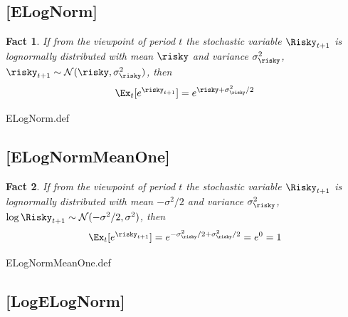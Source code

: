 \documentclass{handout}
\newtheorem{Fact}{Fact}
\begin{document}
\hypertarget{ELogNorm}{}
\subsection{{[{ELogNorm}]}}

\begin{Fact} If from the viewpoint of period $t$ the stochastic variable $\Risky_{t+1}$ is lognormally distributed with mean $\null{\risky}$ and variance $\sigma_{\risky}^{2}$, $\risky_{t+1} \sim \mathcal{N}(\null{\risky},\sigma_{\risky}^{2})$, then 
\begin{equation}
        \Ex_{t}[e^{\risky_{t+1}}] = e^{\null{\risky}+\sigma_{\risky}^{2}/2} \label{eq:ELogNorm}
\end{equation}
\end{Fact}

\begin{verbatimwrite}{ELogNorm.def}
\providecommand{\ELogNorm}{\href{http://www.econ2.jhu.edu/people/ccarroll/public/LectureNotes/MathFacts/MathFactsList\#ELogNorm}{\ensuremath{\mathtt{[ELogNorm]}}}}
\end{verbatimwrite}

\hypertarget{ELogNormMeanOne}{}
\subsection{[ELogNormMeanOne]}

\begin{Fact} If from the viewpoint of period $t$ the stochastic variable $\Risky_{t+1}$ is lognormally distributed with mean $-\sigma^{2}/2$ and variance $\sigma_{\risky}^{2}$, $\log \Risky_{t+1} \sim \mathcal{N}(-\sigma^{2}/2,\sigma^{2})$, then 
\begin{equation}
        \Ex_{t}[e^{\risky_{t+1}}] = e^{-\sigma_{\risky}^{2}/2+\sigma_{\risky}^{2}/2}=e^{0}=1 \label{eq:ELogNormMeanOne}
\end{equation}
\end{Fact}

\begin{verbatimwrite}{ELogNormMeanOne.def}
\providecommand{\ELogNormMeanOne}{\href{http://www.econ2.jhu.edu/people/ccarroll/public/LectureNotes/MathFacts/MathFactsList\#ELogNormMeanOne}{\ensuremath{\mathtt{[ELogNormMeanOne]}}}}
\end{verbatimwrite}

\hypertarget{LogELogNorm}{}
\subsection{[LogELogNorm]}
\end{document}

